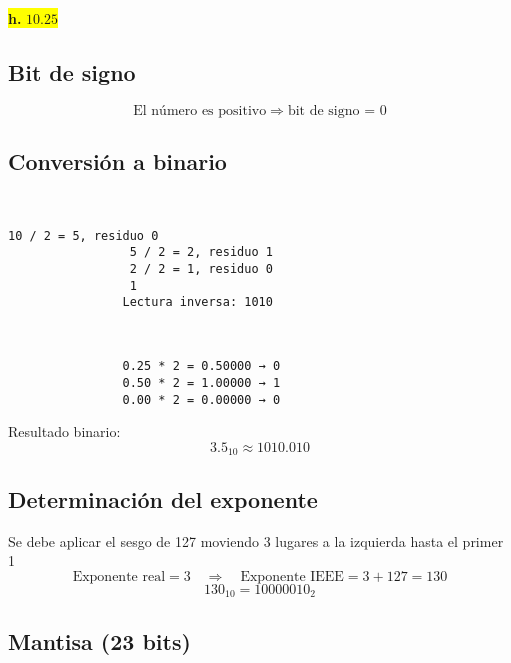 \documentclass[a4paper,12pt]{article}
\begin{document}
	\begin{center}	
		\colorbox{yellow}{{\textbf{h.} $10.25$}}
		
		\subsection*{Bit de signo}
		
		\[
		\text{El número es positivo} \Rightarrow \text{bit de signo = } \boxed{0}
		\]
		
		\subsection*{Conversión a binario}
		~~~~~~~
		\begin{center}
			\begin{Verbatim}[formatcom=\centering]
				10 / 2 = 5, residuo 0
				 5 / 2 = 2, residuo 1
				 2 / 2 = 1, residuo 0
				 1
				Lectura inversa: 1010
			\end{Verbatim}
		\end{center}
		
		
		~~~~~~~~~
		
		\begin{center}
			\begin{Verbatim}
				0.25 * 2 = 0.50000 → 0 
				0.50 * 2 = 1.00000 → 1
				0.00 * 2 = 0.00000 → 0
			\end{Verbatim}
		\end{center}
		
		Resultado binario: 
		\[
		3.5_{10} \approx 1010.010
		\]
		
		\subsection*{Determinación del exponente}
		
		Se debe aplicar el sesgo de 127 moviendo 3 lugares a la izquierda hasta el primer 1
		\vspace{-0.5em}
		\[
		\text{Exponente real} = 3 \quad \Rightarrow \quad \text{Exponente IEEE} = 3 + 127 = 130
		\]
		\vspace{-0.5em}
		\[
		130_{10} = 10000010_2
		\]
		
		\subsection*{Mantisa (23 bits)}
		

\end{center}
\end{document}
